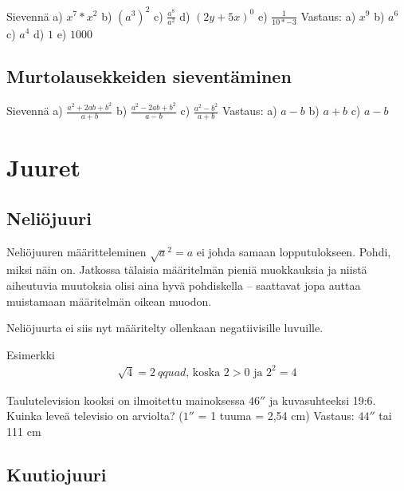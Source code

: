 Sievennä
a) $x^7*x^2$
b) $(a^3)^2$
c) $\frac{a^8}{a^2}$
d) $(2y+5x)^0$
e) $\frac{1}{10*{-3}}$
Vastaus:
a) $x^9$
b) $a^6$
c) $a^4$
d) $1$
e) $1000$

\section{Murtolausekkeiden sieventäminen}

Sievennä
a) $\frac{a^2+2ab+b^2}{a+b}$
b) $\frac{a^2-2ab+b^2}{a-b}$
c) $\frac{a^2-b^2}{a+b}$
Vastaus:
a) $a-b$
b) $a+b$
c) $a-b$

\chapter{Juuret}

\section{Neliöjuuri}


Neliöjuuren määritteleminen $\sqrt{a}^2=a$ ei johda samaan lopputulokseen. Pohdi, miksi näin on.
Jatkossa tälaisia määritelmän pieniä muokkauksia ja niistä aiheutuvia muutoksia olisi aina hyvä pohdiskella -- saattavat jopa auttaa muistamaan määritelmän oikean muodon.

Neliöjuurta ei siis nyt määritelty ollenkaan negatiivisille luvuille.


Esimerkki
\begin{align*}
\sqrt{4} = 2\ qquad\textrm{, koska $2>0$ ja $2^2 =4$} 
\end{align*}

Taulutelevision kooksi on ilmoitettu mainoksessa $46''$ ja kuvasuhteeksi 19:6. Kuinka leveä televisio on arviolta? ($1''$ = 1 tuuma = 2,54 cm)
Vastaus: $44''$ tai 111 cm

\section{Kuutiojuuri}


